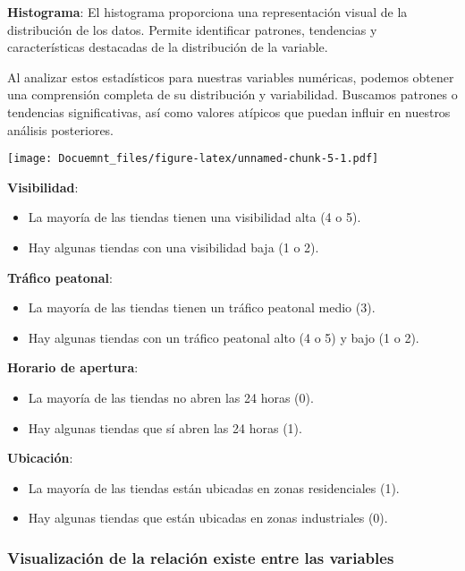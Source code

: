 \documentclass[
]{article}
\providecommand{\tightlist}{%
  \setlength{\itemsep}{0pt}\setlength{\parskip}{0pt}}
\begin{document}
\textbf{Histograma}: El histograma proporciona una representación visual
de la distribución de los datos. Permite identificar patrones,
tendencias y características destacadas de la distribución de la
variable.

Al analizar estos estadísticos para nuestras variables numéricas,
podemos obtener una comprensión completa de su distribución y
variabilidad. Buscamos patrones o tendencias significativas, así como
valores atípicos que puedan influir en nuestros análisis posteriores.

\texttt{[image: Docuemnt\_files/figure-latex/unnamed-chunk-5-1.pdf]}

\textbf{Visibilidad}:

\begin{itemize}
\tightlist
\item
  La mayoría de las tiendas tienen una visibilidad alta (4 o 5).
\item
  Hay algunas tiendas con una visibilidad baja (1 o 2).
\end{itemize}

\textbf{Tráfico peatonal}:

\begin{itemize}
\tightlist
\item
  La mayoría de las tiendas tienen un tráfico peatonal medio (3).
\item
  Hay algunas tiendas con un tráfico peatonal alto (4 o 5) y bajo (1 o
  2).
\end{itemize}

\textbf{Horario de apertura}:

\begin{itemize}
\tightlist
\item
  La mayoría de las tiendas no abren las 24 horas (0).
\item
  Hay algunas tiendas que sí abren las 24 horas (1).
\end{itemize}

\textbf{Ubicación}:

\begin{itemize}
\tightlist
\item
  La mayoría de las tiendas están ubicadas en zonas residenciales (1).
\item
  Hay algunas tiendas que están ubicadas en zonas industriales (0).
\end{itemize}

\hypertarget{visualizaciuxf3n-de-la-relaciuxf3n-existe-entre-las-variables}{%
\subsubsection{Visualización de la relación existe entre las
variables}\label{visualizaciuxf3n-de-la-relaciuxf3n-existe-entre-las-variables}}
\end{document}

